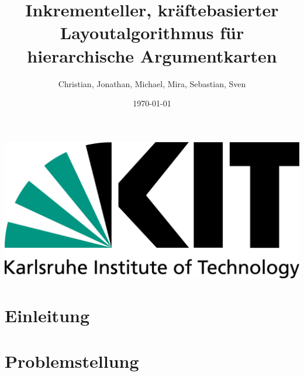 \documentclass[a4paper, oneside]{scrartcl}
\author{Christian, Jonathan, Michael, Mira, Sebastian, Sven}
\date{\today}
\title{\vspace{3cm}Inkrementeller, kräftebasierter Layoutalgorithmus für hierarchische Argumentkarten}
\begin{document}
   
\nonfrenchspacing	
\maketitle

\begin{center}
\vspace{-9cm}
\includegraphics[width = 0.3\linewidth]{Pics/KITLogo.jpg}
\vspace{6.5cm}
\end{center}

\listoftodos

\section{Einleitung}

\section{Problemstellung}
	

	
\end{document}
